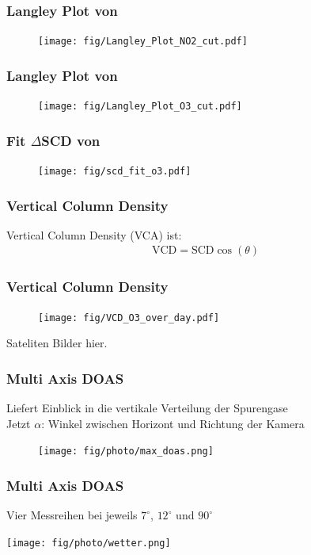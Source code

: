 \documentclass{beamer}
\begin{document}
\begin{frame}
    \frametitle{Langley Plot von }
    \begin{figure}
    \texttt{[image: fig/Langley\_Plot\_NO2\_cut.pdf]}
    \end{figure}
\end{frame}

\begin{frame}
    \frametitle{Langley Plot von }
    \begin{figure}
    \texttt{[image: fig/Langley\_Plot\_O3\_cut.pdf]}
    \end{figure}
\end{frame}

\begin{frame}
    \frametitle{Fit $\Delta$SCD von }
    \begin{figure}
    \texttt{[image: fig/scd\_fit\_o3.pdf]}
    \end{figure}
\end{frame}

\begin{frame}
    \frametitle{Vertical Column Density }
    Vertical Column Density (VCA) ist:
    \begin{align}
        \text{VCD} = \text{SCD} \cos (\theta)
    \end{align}
\end{frame} 

\begin{frame}
    \frametitle{Vertical Column Density }
    \begin{figure}
    \texttt{[image: fig/VCD\_O3\_over\_day.pdf]}
    \end{figure}
\end{frame}

\begin{frame}
    Sateliten Bilder hier.
\end{frame}

\begin{frame}
    \frametitle{Multi Axis DOAS}
    Liefert Einblick in die vertikale Verteilung der Spurengase \\
    Jetzt $\alpha$: Winkel zwischen Horizont und Richtung der Kamera
    \begin{figure}
        \texttt{[image: fig/photo/max\_doas.png]}
    \end{figure}
\end{frame}

\begin{frame}
    \frametitle{Multi Axis DOAS}
    Vier Messreihen bei jeweils $7^\circ$, $12^\circ$ und $90^\circ$ \\
    \begin{center}
    \texttt{[image: fig/photo/wetter.png]}
    \end{center}
\end{frame}
\end{document}
